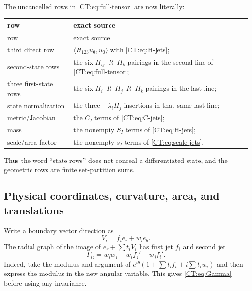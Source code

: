 \documentclass[11pt]{amsart}
\numberwithin{equation}{section}
\theoremstyle{definition}
\theoremstyle{remark}
\begin{document}
The uncancelled rows in \eqref{CT:eq:full-tensor} are now literally:
\begin{center}
\begin{longtable}{>{\raggedright\arraybackslash}p{.23\linewidth}
                  >{\raggedright\arraybackslash}p{.66\linewidth}}
\toprule
row & exact source\\
\midrule
\endfirsthead
\toprule
row & exact source\\
\midrule
\endhead
third direct row & $\langle H_{123}u_0,u_0\rangle$ with
\eqref{CT:eq:H-jets};\\
second-state rows & the six $H_{ij}$--$R$--$H_k$ pairings in the second
line of \eqref{CT:eq:full-tensor};\\
three first-state rows & the six $H_i$--$R$--$H_j$--$R$--$H_k$ pairings
in the last line;\\
state normalization & the three $-\lambda_iH_j$ insertions in that same
last line;\\
metric/Jacobian & the $C_I$ terms of \eqref{CT:eq:C-jets};\\
mass & the nonempty $S_I$ terms of \eqref{CT:eq:H-jets};\\
scale/area factor & the nonempty $s_I$ terms of
\eqref{CT:eq:scale-jets}.\\
\bottomrule
\end{longtable}
\end{center}
Thus the word ``state rows'' does not conceal a differentiated state, and
the geometric rows are finite set-partition sums.

\subsection{Physical coordinates, curvature, area, and translations}

Write a boundary vector direction as
\begin{equation}\label{CT:eq:components}
 V_i=f_i e_r+w_i e_\theta.
\end{equation}
The radial graph of the image of
$e_r+\sum t_iV_i$ has first jet $f_i$ and second jet
\begin{equation}\label{CT:eq:Gamma}
 \Gamma_{ij}=w_iw_j-w_if_j'-w_jf_i'.
\end{equation}
Indeed, take the modulus and argument of
$e^{i\theta}(1+\sum t_if_i+i\sum t_iw_i)$ and then express the modulus in
the new angular variable.  This gives \eqref{CT:eq:Gamma} before using any
invariance.
\end{document}
